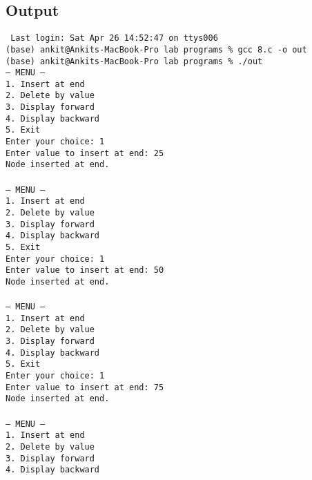 \documentclass[12pt,a4paper]{article}
\begin{document}
\subsection*{Output}
\begin{tcolorbox}[terminalstyle, title=Sample Output]
\texttt{
Last login: Sat Apr 26 14:52:47 on ttys006\\
(base) ankit@Ankits-MacBook-Pro lab programs \% gcc 8.c -o out\\
(base) ankit@Ankits-MacBook-Pro lab programs \% ./out\\
--- MENU ---\\
1. Insert at end\\
2. Delete by value\\
3. Display forward\\
4. Display backward\\
5. Exit\\
Enter your choice: 1\\
Enter value to insert at end: 25\\
Node inserted at end.\\
\\
--- MENU ---\\
1. Insert at end\\
2. Delete by value\\
3. Display forward\\
4. Display backward\\
5. Exit\\
Enter your choice: 1\\
Enter value to insert at end: 50\\
Node inserted at end.\\
\\
--- MENU ---\\
1. Insert at end\\
2. Delete by value\\
3. Display forward\\
4. Display backward\\
5. Exit\\
Enter your choice: 1\\
Enter value to insert at end: 75\\
Node inserted at end.\\
\\
--- MENU ---\\
1. Insert at end\\
2. Delete by value\\
3. Display forward\\
4. Display backward\\
}
\end{tcolorbox}
\end{document}
